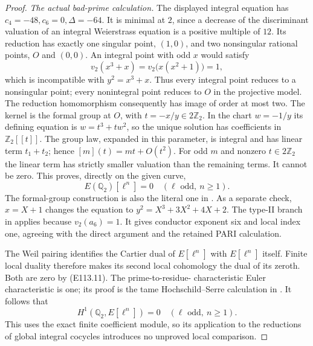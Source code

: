 \begin{proof}
\emph{The actual bad-prime calculation.}
The displayed integral equation has
$c_4=-48,c_6=0,\Delta=-64$.  It is minimal at $2$, since a
decrease of the discriminant valuation of an integral
Weierstrass equation is a positive multiple of $12$.
Its reduction has exactly one singular point, $(1,0)$,
and two nonsingular rational points, $O$ and $(0,0)$.
An integral point with odd $x$ would satisfy
\[
 v_2(x^3+x)=v_2\bigl(x(x^2+1)\bigr)=1,
 \tag{E113.10}
\]
which is incompatible with $y^2=x^3+x$.
Thus every integral point reduces to a nonsingular point;
every nonintegral point reduces to $O$ in the projective model.
The reduction homomorphism consequently has image of order
at most two.  The kernel is the formal group at $O$, with
$t=-x/y\in2\mathbb Z_2$.  In the chart $w=-1/y$ its defining
equation is $w=t^3+tw^2$, so the unique solution has coefficients
in $\mathbb Z_2[[t]]$.  The group law, expanded in this parameter,
is integral and has linear term $t_1+t_2$; hence
$[m](t)=mt+O(t^2)$.  For odd $m$ and nonzero
$t\in2\mathbb Z_2$ the linear term has strictly smaller valuation
than the remaining terms.  It cannot be zero.
This proves, directly on the given curve,
\[
 E(\mathbb Q_2)[\ell^n]=0
                   \quad(\ell\text{ odd},\ n\ge1).
 \tag{E113.11}
\]
The formal-group construction is also the literal one in
\cite[Chapter I, Example 2.5(c)]{E_MilneCFT}.
As a separate check, $x=X+1$ changes the equation to
$y^2=X^3+3X^2+4X+2$.  The type-II branch in
\cite[\S3.2, algorithm step 23]{E113_Cremona} applies because
$v_2(a_6)=1$.  It gives conductor exponent six and local
index one, agreeing with the direct argument and the retained
PARI calculation.

The Weil pairing identifies the Cartier dual of $E[\ell^n]$
with $E[\ell^n]$ itself.  Finite local duality
\cite[Chapter I, Theorem 2.1 and Corollary 2.3]{E_MilneADT}
therefore makes its second local cohomology the dual of its
zeroth.  Both are zero by (E113.11).  The prime-to-residue-
characteristic Euler characteristic is one; its proof is
the tame Hochschild--Serre calculation in
\cite[Chapter I, Lemma 2.9]{E_MilneADT}.
It follows that
\[
 H^1(\mathbb Q_2,E[\ell^n])=0
                   \quad(\ell\text{ odd},\ n\ge1).
 \tag{E113.12}
\]
This uses the exact finite coefficient module, so its application
to the reductions of global integral cocycles introduces no
unproved local comparison.


\end{proof}
